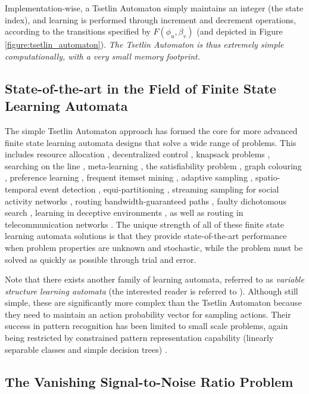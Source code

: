 \documentclass[11pt,a4paper]{article}
\begin{document}
Implementation-wise, a Tsetlin Automaton simply maintains an integer (the state index), and learning is performed through increment and decrement operations, according to the transitions specified by $F(\phi_u, \beta_v)$ (and depicted in Figure \ref{figure:tsetlin_automaton}). \emph{The Tsetlin Automaton is thus extremely simple computationally, with a very small memory footprint.}

\subsection{State-of-the-art in the Field of Finite State Learning Automata}
The simple Tsetlin Automaton approach has formed the core for more advanced finite state learning automata designs that solve a wide range of problems. This includes resource allocation \cite{Granmo2010g}, decentralized control \cite{Tung1996}, knapsack problems \cite{Granmo2007d}, searching on the line \cite{Oommen1997,Yazidi2014}, meta-learning \cite{Oommen2008}, the satisfiability problem \cite{Granmo2007c,Bouhmala2010}, graph colouring \cite{Bouhmala2010}, preference learning \cite{Yazidi2012b}, frequent itemset mining \cite{Haugland2014}, adaptive sampling \cite{Granmo2010}, spatio-temporal event detection \cite{Yazidi2013}, equi-partitioning \cite{Oommen1988}, streaming sampling for social activity networks \cite{Ghavipour2018}, routing bandwidth-guaranteed paths \cite{Oommen2007a}, faulty dichotomous search \cite{Yazidi2018}, learning in deceptive environments \cite{Zhang2016a}, as well as routing in telecommunication networks \cite{Oommen2007c}. The unique strength of all of these finite state learning automata solutions is that they provide state-of-the-art performance when problem properties are unknown and stochastic, while the problem must be solved as quickly as possible through trial and error.

Note that there exists another family of learning automata, referred to as \emph{variable structure learning automata} (the interested reader is referred to \cite{Thathachar2004}). Although still simple, these are significantly more complex than the Tsetlin Automaton because they need to maintain an action probability vector for sampling actions. Their success in pattern recognition has been limited to small scale problems, again being restricted by constrained pattern representation capability (linearly separable classes and simple decision trees) \cite{Thathachar2004,Barto1985,Narendra1989}.

\subsection{The Vanishing Signal-to-Noise Ratio Problem}
\end{document}
